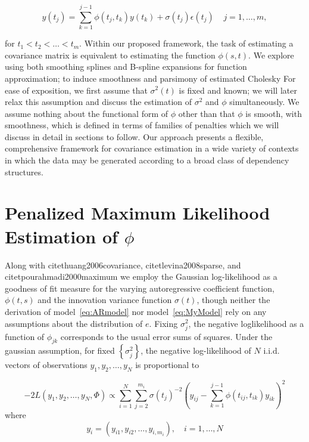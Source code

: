 \documentclass[12pt]{article}
\theoremstyle{definition}
\begin{document}
\begin{equation}   
y\left(t_j \right)  = \sum_{k=1}^{j-1} \phi\left(t_j ,t_k\right) y\left(t_k\right) + \sigma\left(t_j\right)\epsilon\left({t_j}\right) \;\;\;\; j=1,\dots, m, 
\label{eq:MyModel} 
\end{equation}

\noindent for $t_1 < t_2 < \dots < t_m$. 
Within our proposed framework, the task of estimating a covariance matrix is equivalent to estimating the function $\phi\left(s,t\right)$. We explore using both smoothing splines and B-spline expansions for function approximation; to induce smoothness and parsimony of estimated Cholesky For ease of exposition, we first assume that $\sigma^2\left(t\right)$ is fixed and known; we will later relax this assumption and discuss the estimation of $\sigma^2$ and $\phi$ simultaneously.  We assume nothing about the functional form of $\phi$ other than that $\phi$ is smooth, with smoothness, which is defined in terms of families of penalties which we will discuss in detail in sections to follow. %
Our approach presents a flexible, comprehensive framework for covariance estimation in a wide variety of contexts in which the data may be generated according to a broad class of dependency structures.

\section{Penalized Maximum Likelihood Estimation of $\phi$}

Along with citet{huang2006covariance}, citet{levina2008sparse}, and citet{pourahmadi2000maximum} we employ the Gaussian log-likelihood as a goodness of fit measure for the varying  autoregressive coefficient function, $\phi\left(t,s\right)$ and the innovation variance function $\sigma\left(t\right)$, though neither the derivation of model~\ref{eq:ARmodel} nor model~\ref{eq:MyModel} rely on any assumptions about the distribution of $e$. Fixing $\sigma_j^2$, the negative loglikelihood as a function of $\phi_{jk}$ corresponds to the usual error sums of squares.  Under the gaussian assumption, for fixed $\left\{ \sigma_j^2 \right\}$, the negative log-likelihood of $N$ i.i.d. vectors of observations $y_1,y_2,\dots,y_N$ is proportional to

\begin{equation}
-2 L\left(y_1, y_2, \dots,y_N ,\Phi \right) \propto \sum_{i=1}^N \sum_{j=2}^{m_i} \sigma\left({t_j}\right)^{-2} \left(y_{ij} - \sum_{k=1}^{j-1}\phi\left({t_{ij},t_{ik}}\right)y_{ik} \right)^2 \label{loglikelihood}
\end{equation}
\noindent
where 
\[
y_i = \left( y_{i1}, y_{i2}, \dots, y_{i,m_i}\right), \quad i=1,\dots,N 
\] 
\end{document}

